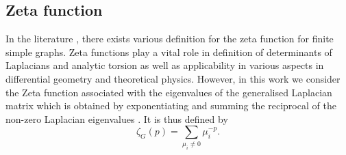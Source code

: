 \documentclass[10pt,a4paper]{article}
\theoremstyle{plain}
\theoremstyle{definition}
\begin{document}
        \subsection{Zeta function}
        In the literature \citep{knill2013zeta,friedli2017spectral}, there exists various definition for the zeta function for finite simple graphs. Zeta functions play a vital role in definition of determinants of Laplacians and analytic torsion \citep{voros1987spectral,  moscovici1991r} as well as applicability in various aspects in differential geometry and theoretical physics. However, in this work we consider the Zeta function associated with the eigenvalues of the generalised Laplacian matrix which is obtained by exponentiating and summing the reciprocal of the non-zero Laplacian eigenvalues \citep{friedli2017spectral}. It is thus defined by
        \begin{equation}
        \zeta_G(p) =  \sum_{\mu_{i} \neq 0} \mu_{i} ^{-p}.
        \end{equation}
             
\end{document}
